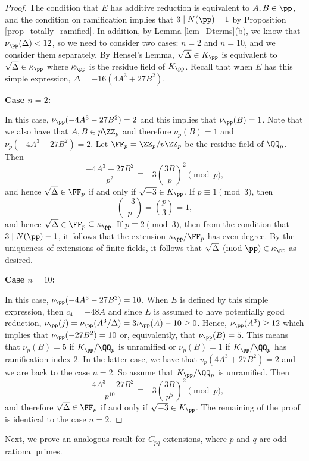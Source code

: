 \begin{proof}
    The condition that $E$ has additive reduction is equivalent to $A,B\in\pp$, and the condition on ramification implies that $3\mid N(\pp)-1$ by Proposition \ref{prop_totally_ramified}. In addition, by Lemma \ref{lem_Dterms}(b), we know that $\nu_\pp(\Delta)<12$, so we need to consider two cases: $n=2$ and $n=10$, and we consider them separately. By Hensel's Lemma, $\sqrt{\Delta}\in K_\pp$ is equivalent to $\sqrt{\Delta}\in \kappa_\pp$ where $\kappa_\pp$ is the residue field of $K_\pp$. Recall that when $E$ has this simple expression, $\Delta=-16(4A^3+27B^2)$.


    \textbf{Case $n=2$:}

    In this case, $\nu_\pp(-4A^3-27B^2)=2$ and this implies that $\nu_\pp(B)=1$. Note that we also have that $A,B\in p\ZZ_p$ and therefore $\nu_p(B)=1$ and $\nu_p(-4A^3-27B^2)=2$. Let $\FF_p=\ZZ_p/p\ZZ_p$ be the residue field of $\QQ_p$. Then 
    $$\frac{-4A^3-27B^2}{p^2}\equiv -3\left(\frac{3B}{p}\right)^2\pmod{p},$$
    and hence $\sqrt{\Delta}\in\FF_p$ if and only if $\sqrt{-3}\in K_\pp$. 
    If $p\equiv1\pmod{3}$, then
    $$\left(\frac{-3}{p}\right)=\left(\frac{p}{3}\right)=1,$$
    and hence $\sqrt{\Delta}\in \FF_p\subseteq \kappa_\pp$. If $p\equiv 2\pmod{3}$, then from the condition that $3\mid N(\pp)-1$, it follows that the extension $\kappa_\pp/\FF_p$ has even degree. By the uniqueness of extensions of finite fields, it follows that $\sqrt{\Delta}\pmod{\pp}\in\kappa_\pp$ as desired.

    \textbf{Case $n=10$:} 

    In this case, $\nu_\pp(-4A^3-27B^2)=10$. When $E$ is defined by this simple expression, then $c_4=-48A$ and since $E$ is assumed to have potentially good reduction, $\nu_\pp(j)=\nu_\pp(A^3/\Delta)=3\nu_\pp(A)-10\geq 0$. Hence, $\nu_\pp(A^3)\geq12$ which implies that $\nu_\pp(-27B^2)=10$ or, equivalently, that $\nu_\pp(B)=5$. This means that $\nu_p(B)=5$ if $K_\pp/\QQ_p$ is unramified or $\nu_p(B)=1$ if $K_\pp/\QQ_p$ has ramification index $2$. In the latter case, we have that $v_p(4A^3+27B^2)=2$ and we are back to the case $n=2$. So assume that $K_\pp/\QQ_p$ is unramified. Then
    $$\frac{-4A^3-27B^2}{p^{10}}\equiv -3\left(\frac{3B}{p^5}\right)^2\pmod{p},$$
    and therefore $\sqrt{\Delta}\in\FF_p$ if and only if $\sqrt{-3}\in K_\pp$. The remaining of the proof is identical to the case $n=2$.

\end{proof}

Next, we prove an analogous result for $C_{pq}$ extensions, where $p$ and $q$ are odd rational primes.

